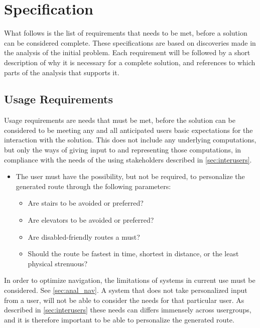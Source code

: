 \section{Specification} %
\label{sec:specification}

What follows is the list of requirements that needs to be met, before a solution can be considered complete. These specifications are based on discoveries made in the analysis of the initial problem. Each requirement will be followed by a short description of why it is necessary for a complete solution, and references to which parts of the analysis that supports it.

\subsection{Usage Requirements}

Usage requirements are needs that must be met, before the solution can be considered to be meeting any and all anticipated users basic expectations for the interaction with the solution. This does not include any underlying computations, but only the ways of giving input to and representing those computations, in compliance with the needs of the using stakeholders described in \cref{sec:interusers}.

\begin{itemize}
	\item The user must have the possibility, but not be required, to personalize the generated route through the following parameters:
			\begin{itemize}
				\item Are stairs to be avoided or preferred?
				\item Are elevators to be avoided or preferred?
				\item Are disabled-friendly routes a must?
				\item Should the route be fastest in time, shortest in distance, or the least physical strenuous?
			\end{itemize}
\end{itemize}

In order to optimize navigation, the limitations of systems in current use must be considered. See \cref{sec:anal_nav}. A system that does not take personalized input from a user, will not be able to consider the needs for that particular user. As described in \cref{sec:interusers} these needs can differs immensely across usergroups, and it is therefore important to be able to personalize the generated route.

